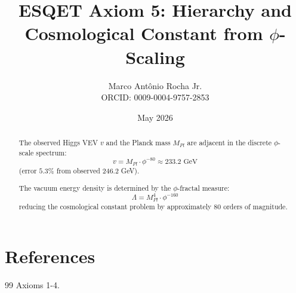 \documentclass[11pt]{article}
\title{ESQET Axiom 5: Hierarchy and Cosmological Constant from $\phi$-Scaling}
\author{Marco Antônio Rocha Jr. \\ 
        ORCID: 0009-0004-9757-2853}
\date{May 2026}
\begin{document}
\maketitle

\begin{abstract}
The observed Higgs VEV $v$ and the Planck mass $M_{Pl}$ are adjacent in the discrete $\phi$-scale spectrum:
\begin{equation}
\boxed{v = M_{Pl} \cdot \phi^{-80} \approx 233.2 \text{ GeV}}
\end{equation}
(error $5.3\%$ from observed $246.2$ GeV).

The vacuum energy density is determined by the $\phi$-fractal measure:
\begin{equation}
\boxed{\Lambda = M_{Pl}^4 \cdot \phi^{-160}}
\end{equation}
reducing the cosmological constant problem by approximately 80 orders of magnitude.
\end{abstract}

\section{References}
\begin{thebibliography}{99}
 Axioms 1-4.
\end{thebibliography}
\end{document}
